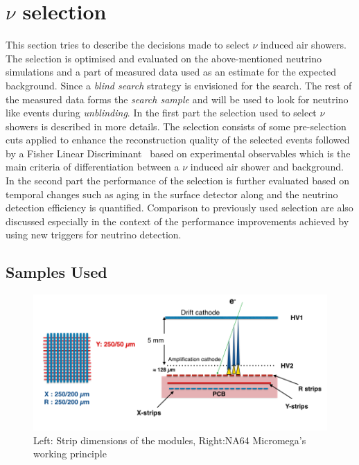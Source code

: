\section{$\nu$ selection}
\label{sec:nu_sel}
This section tries to describe the decisions made to select $\nu$ induced air showers. The selection is optimised and evaluated on the above-mentioned neutrino simulations and a part of measured data used as an estimate for the expected background. Since a \textit{blind search} strategy is envisioned for the search. The rest of the measured data forms the \textit{search sample} and will be used to look for neutrino like events during \textit{unblinding}. 
In the first part the selection used to select $\nu$ showers is described in more details. The selection consists of some pre-selection cuts applied to enhance the reconstruction quality of the selected events followed by a Fisher Linear Discriminant~\cite{} based on experimental observables which is the main criteria of differentiation between a $\nu$ induced air shower and background.  
In the second part the performance of the selection is further evaluated based on temporal changes such as aging in the surface detector along and the neutrino detection efficiency is quantified. Comparison to previously used selection are also discussed especially in the context of the performance improvements achieved by using new triggers for neutrino detection.

\subsection{Samples Used}
\label{subsec:nu_sel_samp}



\begin{figure}[t!]
\centering
\includegraphics[width=\textwidth]{thesis_figures/NA64_MM.png}
\caption{Left: Strip dimensions of the modules, Right:NA64 Micromega's working principle~\cite{Banerjee:2017mdu}}
\label{fig:Micromegas_na64}
\end{figure}

